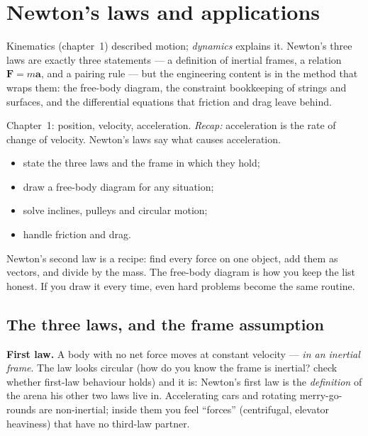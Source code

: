 \chapter{Newton's laws and applications}\label{ch:newton}

Kinematics (chapter~1) described motion; \emph{dynamics} explains it.
Newton's three laws are exactly three statements --- a definition of
inertial frames, a relation $\mathbf F=m\mathbf a$, and a pairing rule ---
but the engineering content is in the method that wraps them: the free-body
diagram, the constraint bookkeeping of strings and surfaces, and the
differential equations that friction and drag leave behind.

\begin{rulebox}
Chapter~1: position, velocity, acceleration. \emph{Recap:} acceleration is the rate of change of velocity. Newton's laws say what causes acceleration.
\end{rulebox}
\begin{wins}
\begin{itemize}
\item state the three laws and the frame in which they hold;
\item draw a free-body diagram for any situation;
\item solve inclines, pulleys and circular motion;
\item handle friction and drag.
\end{itemize}
\end{wins}
\begin{principle}
Newton's second law is a recipe: find every force on one object, add them as vectors, and divide by the mass. The free-body diagram is how you keep the list honest. If you draw it every time, even hard problems become the same routine.
\end{principle}

\section{The three laws, and the frame assumption}\label{sec:new-laws}

\textbf{First law.} A body with no net force moves at constant velocity ---
\emph{in an inertial frame}. The law looks circular (how do you know the
frame is inertial? check whether first-law behaviour holds) and it is:
Newton's first law is the \emph{definition} of the arena his other two laws
live in. Accelerating cars and rotating merry-go-rounds are non-inertial;
inside them you feel ``forces'' (centrifugal, elevator heaviness) that have
no third-law partner.

